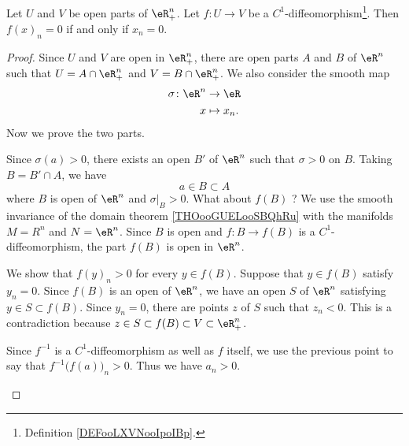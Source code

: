 \begin{lemma}	\label{LEMooLPXFooUBLCqA}
	Let \( U\) and \( V\) be open parts of \( \eR^n_+\). Let \(f \colon U\to V  \) be a \( C^1\)-diffeomorphism\footnote{Definition \ref{DEFooLXVNooIpoIBp}.}. Then \( f(x)_n=0\) if and only if \( x_n=0\).
\end{lemma}

\begin{proof}
	Since \( U\) and \( V\) are open in \( \eR^n_+\), there are open parts \( A\) and \( B\) of \( \eR^n\) such that \( U=A\cap \eR^n_+\) and \( V=B\cap \eR^n_+\). We also consider the smooth map
	\begin{equation}
		\begin{aligned}
			\sigma\colon \eR^n & \to \eR      \\
			x                  & \mapsto x_n.
		\end{aligned}
	\end{equation}
	Now we prove the two  parts.
	\begin{subproof}
		\spitem[Suppose \( a_n>0\)]
		Since \( \sigma(a)>0\), there exists an open \( B'\) of \( \eR^n\) such that \( \sigma>0\) on \( B\). Taking \( B=B'\cap A\), we have
		\begin{equation}
			a\in B\subset A
		\end{equation}
		where \( B\) is open of \( \eR^n\) and \( \sigma|_B>0\). What about \( f(B)\) ? We use the smooth invariance of the domain theorem \ref{THOooGUELooSBQhRu} with the manifolds \( M=R^n\) and \( N=\eR^n\). Since \( B\) is open and \(f \colon B\to f(B)  \) is a \( C^1\)-diffeomorphism, the part \( f(B)\) is open in \( \eR^n\).

		We show that \( f(y)_n>0\) for every \( y\in f(B)\). Suppose that \( y\in f(B)\) satisfy \( y_n=0\). Since \( f(B)\) is an open of \( \eR^n\), we have an open \( S\) of \( \eR^n\) satisfying \( y\in S\subset f(B)\). Since \( y_n=0\), there are points \( z\) of \( S\) such that \( z_n<0\). This is a contradiction because \( z\in S\subset f(B)\subset V\subset \eR^n_+\).

		\spitem[Suppose \( f(a)_n>0\)]
		Since \( f^{-1}\) is a \( C^1\)-diffeomorphism as well as \( f\) itself, we use the previous point to say that \( f^{-1}\big( f(a) \big)_n>0\). Thus we have \( a_n>0\).
	\end{subproof}
\end{proof}



